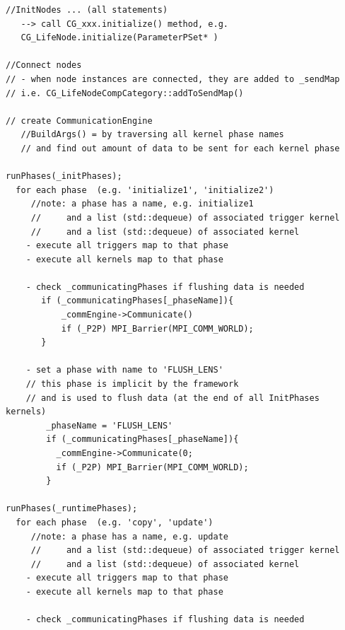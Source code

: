 \begin{verbatim}
//InitNodes ... (all statements)
   --> call CG_xxx.initialize() method, e.g.
   CG_LifeNode.initialize(ParameterPSet* )
 
//Connect nodes
// - when node instances are connected, they are added to _sendMap
// i.e. CG_LifeNodeCompCategory::addToSendMap() 
   
// create CommunicationEngine
   //BuildArgs() = by traversing all kernel phase names
   // and find out amount of data to be sent for each kernel phase
   
runPhases(_initPhases);
  for each phase  (e.g. 'initialize1', 'initialize2')
     //note: a phase has a name, e.g. initialize1
     //     and a list (std::dequeue) of associated trigger kernel
     //     and a list (std::dequeue) of associated kernel
    - execute all triggers map to that phase
    - execute all kernels map to that phase
    
    - check _communicatingPhases if flushing data is needed
       if (_communicatingPhases[_phaseName]){
           _commEngine->Communicate()
           if (_P2P) MPI_Barrier(MPI_COMM_WORLD);
       }
    
    - set a phase with name to 'FLUSH_LENS' 
    // this phase is implicit by the framework
    // and is used to flush data (at the end of all InitPhases kernels)
        _phaseName = 'FLUSH_LENS'
        if (_communicatingPhases[_phaseName]){
          _commEngine->Communicate(0;
          if (_P2P) MPI_Barrier(MPI_COMM_WORLD);
        }

runPhases(_runtimePhases);
  for each phase  (e.g. 'copy', 'update')
     //note: a phase has a name, e.g. update
     //     and a list (std::dequeue) of associated trigger kernel
     //     and a list (std::dequeue) of associated kernel
    - execute all triggers map to that phase
    - execute all kernels map to that phase
    
    - check _communicatingPhases if flushing data is needed
\end{verbatim}



